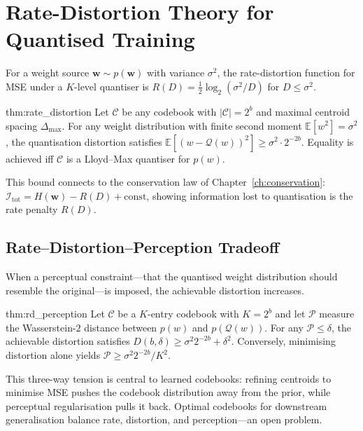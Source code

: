 \section{Rate-Distortion Theory for Quantised Training}
\label{sec:rate_distortion}
For a weight source $\mathbf{w} \sim p(\mathbf{w})$ with variance $\sigma^2$,
the rate-distortion function for MSE under a $K$-level quantiser is
$R(D) = \frac{1}{2} \log_2(\sigma^2 / D)$ for $D \leq \sigma^2$.
\begin{mythm}{thm:rate_distortion}
Let $\mathcal{C}$ be any codebook with $|\mathcal{C}| = 2^b$ and maximal
centroid spacing $\Delta_{\max}$. For any weight distribution with finite
second moment $\mathbb{E}[w^2] = \sigma^2$, the quantisation distortion
satisfies $\mathbb{E}[(w - \mathcal{Q}(w))^2] \geq \sigma^2 \cdot 2^{-2b}$.
Equality is achieved iff $\mathcal{C}$ is a Lloyd--Max quantiser for
$p(w)$.
\end{mythm}
This bound connects to the conservation law of Chapter~\ref{ch:conservation}:
$\mathcal{I}_{\text{tot}} = H(\mathbf{w}) - R(D) + \text{const}$, showing
information lost to quantisation is the rate penalty $R(D)$.
\subsection{Rate--Distortion--Perception Tradeoff}
When a perceptual constraint---that the quantised weight distribution should
resemble the original---is imposed, the achievable distortion increases.
\begin{mythm}{thm:rd_perception}
Let $\mathcal{C}$ be a $K$-entry codebook with $K = 2^b$ and let
$\mathcal{P}$ measure the Wasserstein-$2$ distance between $p(w)$ and
$p(\mathcal{Q}(w))$. For any $\mathcal{P} \leq \delta$, the achievable
distortion satisfies $D(b, \delta) \geq \sigma^2 2^{-2b} + \delta^2$.
Conversely, minimising distortion alone yields $\mathcal{P} \geq
\sigma^2 2^{-2b} / K^2$.
\end{mythm}
This three-way tension is central to learned codebooks: refining centroids
to minimise MSE pushes the codebook distribution away from the prior, while
perceptual regularisation pulls it back. Optimal codebooks for downstream
generalisation balance rate, distortion, and perception---an open problem.


